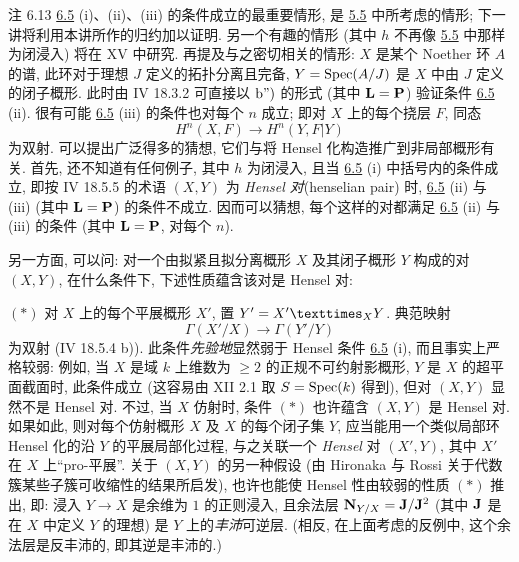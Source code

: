 \begin{enonce*}[remark]{注 6.13}
\hyperref[XII.prop6.5]{6.5} (i)、(ii)、(iii) 的条件成立的最重要情形, 是 \hyperref[XII.cor5.5]{5.5} 中所考虑的情形; 下一讲将利用本讲所作的归约加以证明. 另一个有趣的情形 (其中 $h$ 不再像 \hyperref[XII.cor5.5]{5.5} 中那样为闭浸入) 将在 XV 中研究. 再提及与之密切相关的情形: $X$ 是某个 Noether 环 $A$ 的谱, 此环对于理想 $J$ 定义的拓扑分离且完备, $Y=\operatorname{Spec}(A/J)$ 是 $X$ 中由 $J$ 定义的闭子概形. 此时由 \EGA IV 18.3.2 可直接以\pageoriginale $\textup{ b'')}$ 的形式 (其中 $\mathbf{L}=\mathbf{P}$) 验证条件 \hyperref[XII.prop6.5]{6.5} (ii). 很有可能 \hyperref[XII.prop6.5]{6.5} (iii) 的条件也对每个 $n$ 成立; 即对 $X$ 上的每个挠层 $F$, 同态
$$
H^n(X,F)\longrightarrow H^n(Y,F|Y)
$$
为双射. 可以提出广泛得多的猜想, 它们与将 Hensel 化构造推广到非局部概形有关. 首先, 还不知道有任何例子, 其中 $h$ 为闭浸入, 且当 \hyperref[XII.prop6.5]{6.5} (i) 中括号内的条件成立, 即按 \EGA IV 18.5.5 的术语 $(X,Y)$ 为 \emph{Hensel 对}(henselian pair) 时, \hyperref[XII.prop6.5]{6.5} (ii) 与 (iii) (其中 $\mathbf{L}=\mathbf{P}$) 的条件不成立. 因而可以猜想, 每个这样的对都满足 \hyperref[XII.prop6.5]{6.5} (ii) 与 (iii) 的条件 (其中 $\mathbf{L}=\mathbf{P}$, 对每个 $n$).

另一方面, 可以问: 对一个由拟紧且拟分离概形 $X$ 及其闭子概形 $Y$ 构成的对 $(X,Y)$, 在什么条件下, 下述性质蕴含该对是 Hensel 对:

$(\ast)$ 对 $X$ 上的每个平展概形 $X'$, 置 $Y'=\fprod{X'}{Y}{X}$. 典范映射
$$
\Gamma(X'/X)\longrightarrow\Gamma(Y'/Y)
$$
为双射 (\cf \EGA IV 18.5.4 b)). 此条件\emph{先验地}显然弱于 Hensel 条件 \hyperref[XII.prop6.5]{6.5} (i), 而且事实上严格较弱: 例如, 当 $X$ 是域 $k$ 上维数为 $\geq2$ 的正规不可约射影概形, $Y$ 是 $X$ 的超平面截面时, 此条件成立 (这容易由  XII 2.1 取 $S=\operatorname{Spec}(k)$ 得到), 但对 $(X,Y)$ 显然不是 Hensel 对. 不过, 当 $X$ 仿射时, 条件 $(\ast)$ 也许蕴含 $(X,Y)$ 是 Hensel 对. 如果如此, 则对每个仿射概形 $X$ 及 $X$ 的每个闭子集 $Y$, 应当能用一个\pageoriginale 类似局部环 Hensel 化的沿 $Y$ 的平展局部化过程, 与之关联一个 \emph{Hensel} 对 $(X',Y)$, 其中 $X'$ 在 $X$ 上“pro-平展”. 关于 $(X,Y)$ 的另一种假设 (由 Hironaka 与 Rossi 关于代数簇某些子簇可收缩性的结果所启发), 也许也能使 Hensel 性由较弱的性质 $(\ast)$ 推出, 即: 浸入 $Y\rightarrow X$ 是余维为 $1$ 的正则浸入, 且余法层 $\mathbf{N}_{Y/X}=\mathbf{J}/\mathbf{J}^2$ (其中 $\mathbf{J}$ 是在 $X$ 中定义 $Y$ 的理想) 是 $Y$ 上的\emph{丰沛}可逆层. (相反, 在上面考虑的反例中, 这个余法层是反丰沛的, 即其逆是丰沛的.)
\end{enonce*}



